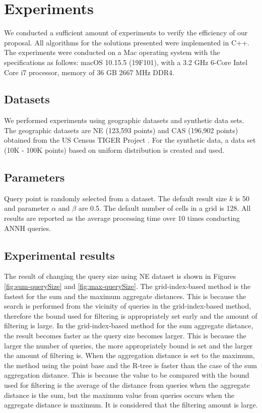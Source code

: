 \documentclass[a4paper,11pt]{report}
\theoremstyle{mytheoremstyle}
\begin{document}
\chapter{Experiments}
\label{section:experiments}

We conducted a sufficient amount of experiments to verify the efficiency of our proposal. All algorithms for the solutions presented were implemented in C++. The experiments were conducted on a Mac operating system with the specifications as follows: macOS 10.15.5 (19F101), with a 3.2 GHz 6-Core Intel Core i7 processor, memory of 36 GB 2667 MHz DDR4.

\section{Datasets}
We performed experiments using geographic datasets and synthetic data sets. The geographic datasets are NE (123,593 points) and CAS (196,902 points) obtained from the US Census TIGER Project \cite{chorochronos}. For the synthetic data, a data set (10K - 100K points) based on uniform distribution is created and used.

\section{Parameters}
Query point is randomly selected from a dataset. The default result size $k$ is 50 and parameter $\alpha$ and $\beta$ are 0.5. The default number of cells in a grid is 128. All results are reported as the average processing time over 10 times conducting ANNH queries.

\section{Experimental results}

The result of changing the query size using NE dataset is shown in Figures \ref{fig:sum-querySize} and  \ref{fig:max-querySize}. The grid-index-based method is the fastest for the sum and the maximum aggregate distances. This is because the search is performed from the vicinity of queries in the grid-index-based method, therefore the bound used for filtering is appropriately set early and the amount of filtering is large. In the grid-index-based method for the sum aggregate distance, the result becomes faster as the query size becomes larger. This is because the larger the number of queries, the more appropriately bound is set and the larger the amount of filtering is. When the aggregation distance is set to the maximum, the method using the point base and the R-tree is faster than the case of the sum aggregation distance. This is because the value to be compared with the bound used for filtering is the average of the distance from queries when the aggregate distance is the sum, but the maximum value from queries occurs when the aggregate distance is maximum. It is considered that the filtering amount is large.
\end{document}
